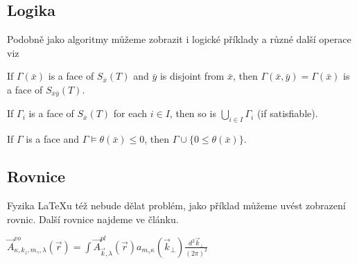 \documentclass[a4paper, 11pt]{article}
\begin{document}
\subsection{Logika}
Podobně jako algoritmy můžeme zobrazit i logické příklady a různé další operace viz \cite{Bagheri2024}\vspace{1em} 

If $\Gamma(\bar{x})$ is a face of $S_{\bar{x}}(T)$ and $\bar{y}$ is disjoint from $\bar{x}$, then $\Gamma(\bar{x}, \bar{y}) = \Gamma(\bar{x})$ is a face of $S_{\bar{x} \bar{y}}(T)$.

If $\Gamma_i$ is a face of $S_{\bar{x}}(T)$ for each $i \in I$, then so is $\bigcup_{i \in I} \Gamma_i$ (if satisfiable).

If $\Gamma$ is a face and $\Gamma \models \theta(\bar{x}) \leq 0$, then $\Gamma \cup \{0 \leq \theta(\bar{x})\}$.


\subsection{Rovnice}
Fyzika \LaTeX u též nebude dělat problém, jako příklad můžeme uvést zobrazení rovnic. Další rovnice najdeme ve článku. \cite{YiXu2024}
\vspace{1em}

$
\vec{A}_{\kappa, k_z, m_\gamma, \lambda}^{v o}(\vec{r})=\int \vec{A}_{\vec{k}, \lambda}^{p l}(\vec{r}) a_{m_\gamma \kappa}\left(\vec{k}_{\perp}\right) \frac{d^2 \vec{k}_{\perp}}{(2 \pi)^2}
$

\newpage
	
	\renewcommand{\refname}{Literatura}
	

 
\end{document}
